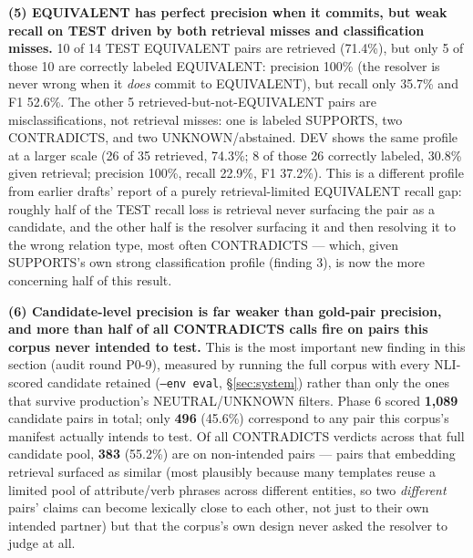 \textbf{(5) EQUIVALENT has perfect precision when it commits, but weak
recall on TEST driven by both retrieval misses and classification
misses.} 10 of 14 TEST EQUIVALENT pairs are retrieved (71.4\%), but only
5 of those 10 are correctly labeled EQUIVALENT: precision 100\% (the
resolver is never wrong when it \emph{does} commit to EQUIVALENT), but
recall only 35.7\% and F1 52.6\%. The other 5 retrieved-but-not-EQUIVALENT
pairs are misclassifications, not retrieval misses: one is labeled
SUPPORTS, two CONTRADICTS, and two UNKNOWN/abstained. DEV shows the same
profile at a larger scale (26 of 35 retrieved, 74.3\%; 8 of those 26
correctly labeled, 30.8\% given retrieval; precision 100\%, recall
22.9\%, F1 37.2\%). This is a different profile from earlier drafts'
report of a purely retrieval-limited EQUIVALENT recall gap: roughly half
of the TEST recall loss is retrieval never surfacing the pair as a
candidate, and the other half is the resolver surfacing it and then
resolving it to the wrong relation type, most often CONTRADICTS --- which,
given SUPPORTS's own strong classification profile (finding 3), is now
the more concerning half of this result.

\textbf{(6) Candidate-level precision is far weaker than gold-pair
precision, and more than half of all CONTRADICTS calls fire on pairs
this corpus never intended to test.} This is the most important new
finding in this section (audit round P0-9), measured by running the
full corpus with every NLI-scored candidate retained
(\texttt{--env eval}, \S\ref{sec:system}) rather than only the ones that
survive production's NEUTRAL/UNKNOWN filters. Phase 6 scored
\textbf{1{,}089} candidate pairs in total; only \textbf{496} (45.6\%)
correspond to any pair this corpus's manifest actually intends to test.
Of all CONTRADICTS verdicts across that full candidate pool,
\textbf{383} (55.2\%) are on non-intended pairs --- pairs that
embedding retrieval surfaced as similar (most plausibly because many
templates reuse a limited pool of attribute/verb phrases across
different entities, so two \emph{different} pairs' claims can become
lexically close to each other, not just to their own intended partner)
but that the corpus's own design never asked the resolver to judge at
all.



